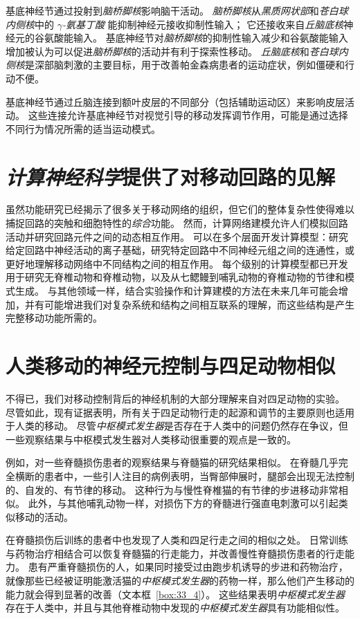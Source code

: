 基底神经节通过投射到\textit{脑桥脚核}影响脑干活动。
\textit{脑桥脚核}从\textit{黑质网状部}和\textit{苍白球内侧核}中的 \textit{$\gamma$-氨基丁酸} 能抑制神经元接收抑制性输入；
它还接收来自\textit{丘脑底核}神经元的谷氨酸能输入。
基底神经节对\textit{脑桥脚核}的抑制性输入减少和谷氨酸能输入增加被认为可以促进\textit{脑桥脚核}的活动并有利于探索性移动。
\textit{丘脑底核}和\textit{苍白球内侧核}是深部脑刺激的主要目标，用于改善帕金森病患者的运动症状，例如僵硬和行动不便。


基底神经节通过丘脑连接到额叶皮层的不同部分（包括辅助运动区）来影响皮层活动。
这些连接允许基底神经节对视觉引导的移动发挥调节作用，可能是通过选择不同行为情况所需的适当运动模式。



\section{\textit{计算神经科学}提供了对移动回路的见解}

虽然功能研究已经揭示了很多关于移动网络的组织，但它们的整体复杂性使得难以捕捉回路的突触和细胞特性的\textit{综合}功能。
然而，计算网络建模允许人们模拟回路活动并研究回路元件之间的动态相互作用。
可以在多个层面开发计算模型：研究给定回路中神经活动的离子基础，研究特定回路中不同神经元组之间的连通性，或更好地理解移动网络中不同结构之间的相互作用。
每个级别的计算模型都已开发用于研究无脊椎动物和脊椎动物，以及从七鳃鳗到哺乳动物的脊椎动物的节律和模式生成。
与其他领域一样，结合实验操作和计算建模的方法在未来几年可能会增加，并有可能增进我们对复杂系统和结构之间相互联系的理解，而这些结构是产生完整移动功能所需的。


\section{人类移动的神经元控制与四足动物相似}

不得已，我们对移动控制背后的神经机制的大部分理解来自对四足动物的实验。
尽管如此，现有证据表明，所有关于四足动物行走的起源和调节的主要原则也适用于人类的移动。
尽管\textit{中枢模式发生器}是否存在于人类中的问题仍然存在争议，但一些观察结果与中枢模式发生器对人类移动很重要的观点是一致的。


例如，对一些脊髓损伤患者的观察结果与脊髓猫的研究结果相似。
在脊髓几乎完全横断的患者中，一些引人注目的病例表明，当臀部伸展时，腿部会出现无法控制的、自发的、有节律的移动。
这种行为与慢性脊椎猫的有节律的步进移动非常相似。
此外，与其他哺乳动物一样，对损伤下方的脊髓进行强直电刺激可以引起类似移动的活动。


在脊髓损伤后训练的患者中也发现了人类和四足行走之间的相似之处。
日常训练与药物治疗相结合可以恢复脊髓猫的行走能力，并改善慢性脊髓损伤患者的行走能力。
患有严重脊髓损伤的人，如果同时接受过由跑步机诱导的步进和药物治疗，就像那些已经被证明能激活猫的\textit{中枢模式发生器}的药物一样，那么他们产生移动的能力就会得到显著的改善（文本框~\ref{box:33_4}）。
这些结果表明\textit{中枢模式发生器}存在于人类中，并且与其他脊椎动物中发现的\textit{中枢模式发生器}具有功能相似性。



